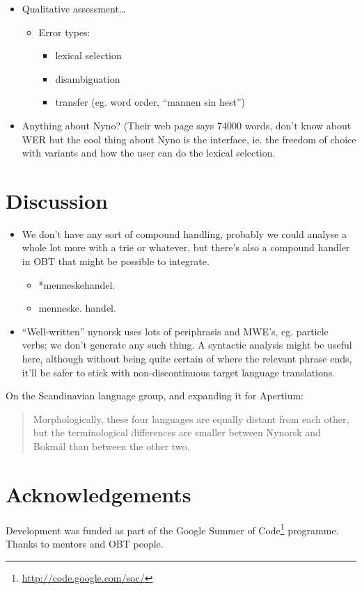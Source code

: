 \documentclass[11pt]{article}
\begin{document}
\begin{itemize}
\item Qualitative assessment\ldots{}

\begin{itemize}
\item Error types:

\begin{itemize}
\item lexical selection
\item disambiguation
\item transfer (eg. word order, ``mannen sin hest'')
\end{itemize}

\end{itemize}

\item Anything about Nyno? (Their web page says 74000 words, don't know
  about WER but the cool thing about Nyno is the interface, ie. the
  freedom of choice with variants and how the user can do the lexical
  selection.
\end{itemize}
\section{Discussion}
\label{sec-5}

\begin{itemize}
\item We don't have any sort of compound handling, probably we could
  analyse a whole lot more with a trie or whatever, but there's also a
  compound handler in OBT that might be possible to integrate.

\begin{itemize}
\item *menneskehandel.
\item menneske. handel.
\end{itemize}

\item ``Well-written'' nynorsk uses lots of periphrasis and MWE's, eg. particle
  verbs; we don't generate any such thing. A syntactic analysis might
  be useful here, although without being quite certain of where the
  relevant phrase ends, it'll be safer to stick with non-discontinuous
  target language translations.
\end{itemize}
On the Scandinavian language group, and expanding it for Apertium:
\begin{quote}
Morphologically, these four languages are equally distant from each
other, but the terminological differences are smaller between Nynorsk
and Bokmål than between the other two. \\
\citep{everson2000sln}
\end{quote}


\section{Acknowledgements}
\label{sec-6}

Development was funded as part of the Google Summer of Code\footnote{\href{http://code.google.com/soc/}{http://code.google.com/soc/} }
programme. Thanks to mentors and OBT people.



\end{document}

